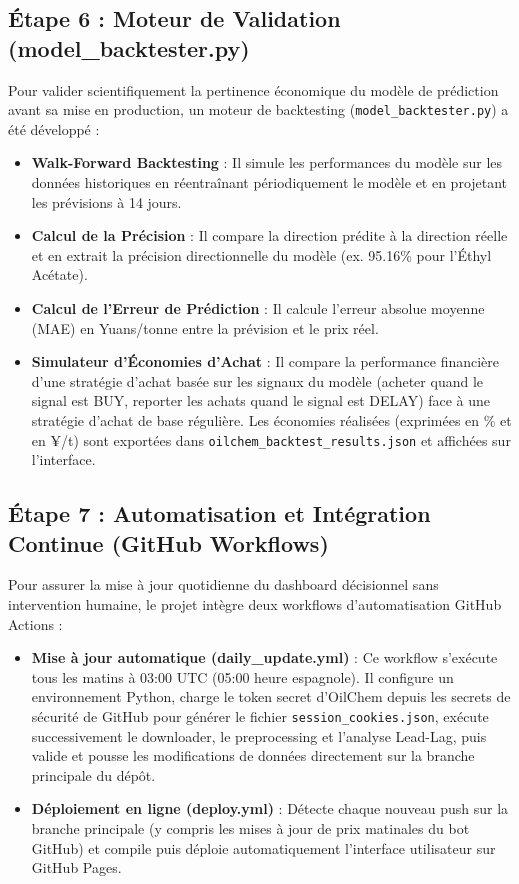 \documentclass[12pt,a4paper]{article}
\begin{document}
\subsection{Étape 6 : Moteur de Validation (model\_backtester.py)}
Pour valider scientifiquement la pertinence économique du modèle de prédiction avant sa mise en production, un moteur de backtesting (\texttt{model\_backtester.py}) a été développé :
\begin{itemize}
    \item \textbf{Walk-Forward Backtesting} : Il simule les performances du modèle sur les données historiques en réentraînant périodiquement le modèle et en projetant les prévisions à 14 jours.
    \item \textbf{Calcul de la Précision} : Il compare la direction prédite à la direction réelle et en extrait la précision directionnelle du modèle (ex. 95.16\% pour l'Éthyl Acétate).
    \item \textbf{Calcul de l'Erreur de Prédiction} : Il calcule l'erreur absolue moyenne (MAE) en Yuans/tonne entre la prévision et le prix réel.
    \item \textbf{Simulateur d'Économies d'Achat} : Il compare la performance financière d'une stratégie d'achat basée sur les signaux du modèle (acheter quand le signal est BUY, reporter les achats quand le signal est DELAY) face à une stratégie d'achat de base régulière. Les économies réalisées (exprimées en \% et en ¥/t) sont exportées dans \texttt{oilchem\_backtest\_results.json} et affichées sur l'interface.
\end{itemize}

\subsection{Étape 7 : Automatisation et Intégration Continue (GitHub Workflows)}
Pour assurer la mise à jour quotidienne du dashboard décisionnel sans intervention humaine, le projet intègre deux workflows d'automatisation GitHub Actions :
\begin{itemize}
    \item \textbf{Mise à jour automatique (daily\_update.yml)} : Ce workflow s'exécute tous les matins à 03:00 UTC (05:00 heure espagnole). Il configure un environnement Python, charge le token secret d'OilChem depuis les secrets de sécurité de GitHub pour générer le fichier \texttt{session\_cookies.json}, exécute successivement le downloader, le preprocessing et l'analyse Lead-Lag, puis valide et pousse les modifications de données directement sur la branche principale du dépôt.
    \item \textbf{Déploiement en ligne (deploy.yml)} : Détecte chaque nouveau push sur la branche principale (y compris les mises à jour de prix matinales du bot GitHub) et compile puis déploie automatiquement l'interface utilisateur sur GitHub Pages.
\end{itemize}
\end{document}
